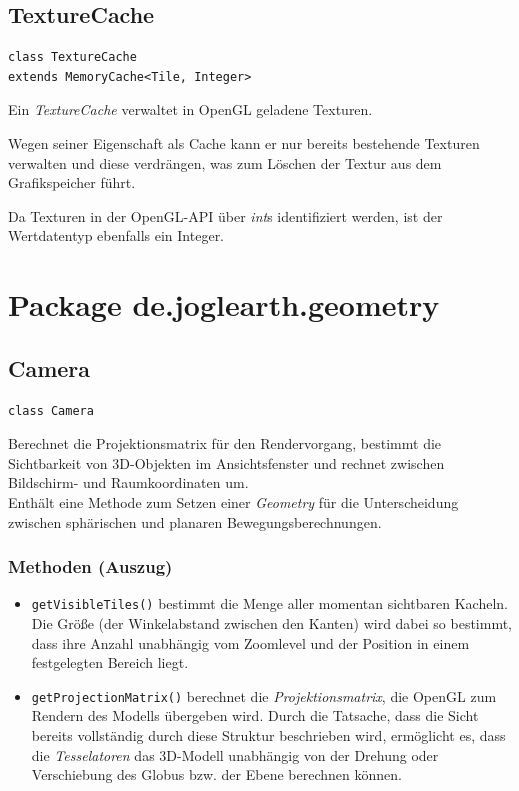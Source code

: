 \documentclass[10pt]{scrreprt}
\begin{document}
\vspace{5mm}
\subsection*{TextureCache}
\begin{lstlisting}
class TextureCache
extends MemoryCache<Tile, Integer>
\end{lstlisting}
Ein \textit{TextureCache} verwaltet in OpenGL geladene Texturen.

Wegen seiner Eigenschaft als Cache kann er nur bereits bestehende Texturen verwalten und diese verdrängen, was zum Löschen der Textur aus dem Grafikspeicher führt. 

Da Texturen in der OpenGL-API über \textit{int}s identifiziert werden, ist der Wertdatentyp ebenfalls ein Integer.\\


\vspace{5mm}
\section{Package de.joglearth.geometry}
\subsection*{Camera}
\begin{lstlisting}
class Camera
\end{lstlisting}
Berechnet die Projektionsmatrix für den Rendervorgang, bestimmt die Sichtbarkeit von 3D-Objekten im Ansichtsfenster und rechnet zwischen Bildschirm- und Raumkoordinaten um.\\
Enthält eine Methode zum Setzen einer \textit{Geometry} für die Unterscheidung zwischen sphärischen und planaren Bewegungsberechnungen.\\
\subsubsection*{Methoden (Auszug)}
\begin{itemize}
\item \texttt{getVisibleTiles()} bestimmt die Menge aller momentan sichtbaren Kacheln. Die Größe (der Winkelabstand zwischen den Kanten) wird dabei so bestimmt, dass ihre Anzahl unabhängig vom Zoomlevel und der Position in einem festgelegten Bereich liegt.
\item \texttt{getProjectionMatrix()} berechnet die \textit{Projektionsmatrix}, die OpenGL zum Rendern des Modells übergeben wird. Durch die Tatsache, dass die Sicht bereits vollständig durch diese Struktur beschrieben wird, ermöglicht es, dass die \textit{Tesselatoren} das 3D-Modell unabhängig von der Drehung oder Verschiebung des Globus bzw. der Ebene berechnen können.
\end{itemize}
\end{document}
